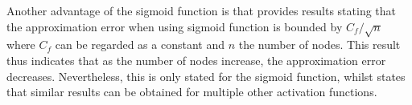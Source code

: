 Another advantage of the sigmoid function is that \citep{Barron} provides results stating that the approximation error when using sigmoid function is bounded by $C_f/\sqrt{n}$ where $C_f$ can be regarded as a constant and $n$ the number of nodes. This result thus indicates that as the number of nodes increase, the approximation error decreases. Nevertheless, this is only stated for the sigmoid function, whilst \citep[s. 117]{Barron} states that similar results can be obtained for multiple other activation functions.





